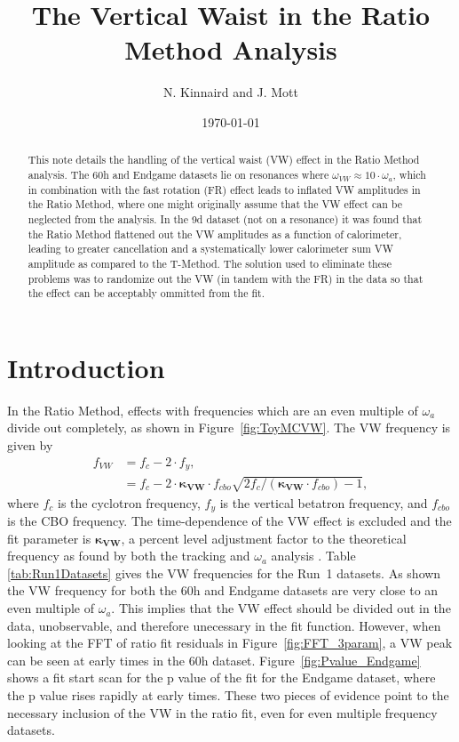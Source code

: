 \documentclass[12pt,letterpaper]{article}
\title{The Vertical Waist in the Ratio Method Analysis}
\author{N. Kinnaird and J. Mott}
\date{\today}
\newcommand{\figref}[1]{Figure~\ref{#1}}
\def\wa{$\omega_{a}$\xspace}
\begin{document}
\maketitle

\begin{abstract}
This note details the handling of the vertical waist (VW) effect in the Ratio Method analysis. The 60h and Endgame datasets lie on resonances where $\omega_{VW} \approx 10 \cdot \omega_{a}$, which in combination with the fast rotation (FR) effect leads to inflated VW amplitudes in the Ratio Method, where one might originally assume that the VW effect can be neglected from the analysis. In the 9d dataset (not on a resonance) it was found that the Ratio Method flattened out the VW amplitudes as a function of calorimeter, leading to greater cancellation and a systematically lower calorimeter sum VW amplitude as compared to the T-Method. The solution used to eliminate these problems was to randomize out the VW (in tandem with the FR) in the data so that the effect can be acceptably ommitted from the fit.
\end{abstract}


\section{Introduction}

In the Ratio Method, effects with frequencies which are an even multiple of \wa divide out completely, as shown in \figref{fig:ToyMCVW}. The VW frequency is given by
    \begin{align} \label{eq:VWfreqKappa}
        f_{VW} &= f_{c} - 2 \cdot f_{y}, \\
               &= f_{c} - 2 \cdot \boldsymbol{\kappa_{VW}} \cdot f_{cbo}\sqrt{2f_{c}/(\boldsymbol{\kappa_{VW}} \cdot f_{cbo})-1},
    \end{align}
where $f_{c}$ is the cyclotron frequency, $f_{y}$ is the vertical betatron frequency, and $f_{cbo}$ is the CBO frequency. The time-dependence of the VW effect is excluded and the fit parameter is $\boldsymbol{\kappa_{VW}}$, a percent level adjustment factor to the theoretical frequency as found by both the tracking and \wa analysis \cite{cbofrequency}. Table \ref{tab:Run1Datasets} gives the VW frequencies for the Run~1 datasets. As shown the VW frequency for both the 60h and Endgame datasets are very close to an even multiple of \wa. This implies that the VW effect should be divided out in the data, unobservable, and therefore unecessary in the fit function. However, when looking at the FFT of ratio fit residuals in \figref{fig:FFT_3param}, a VW peak can be seen at early times in the 60h dataset. \figref{fig:Pvalue_Endgame} shows a fit start scan for the p value of the fit for the Endgame dataset, where the p value rises rapidly at early times. These two pieces of evidence point to the necessary inclusion of the VW in the ratio fit, even for even multiple frequency datasets.
\end{document}
